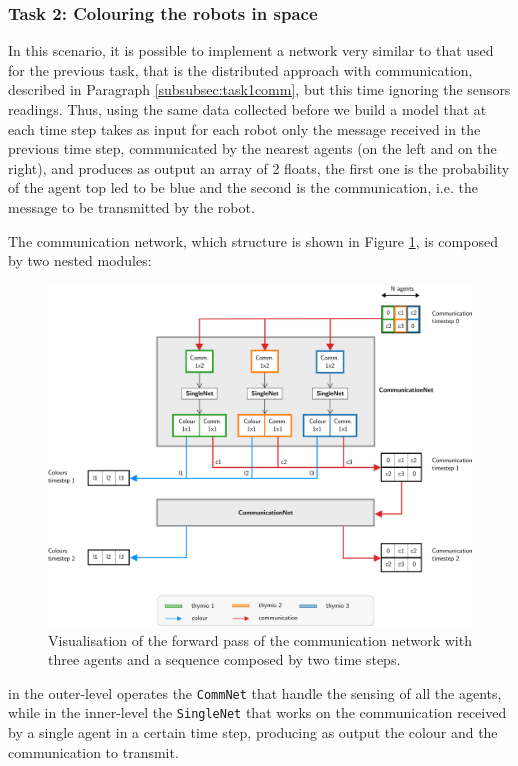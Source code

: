 \subsubsection{Task 2: Colouring the robots in space}
In this scenario, it is possible to implement a network very similar to that used for 
the previous task, that is the distributed approach with communication, described 
in Paragraph \ref{subsubsec:task1comm}, but this time ignoring the sensors 
readings.
Thus, using the same data collected before we build a model that at each time 
step takes as input for each robot only the message received in the previous time 
step, communicated by the nearest agents (on the left and on the right), and 
produces as output an array of 2 floats, the first one is the probability of the agent 
top \gls{led} to be blue and the second is the communication, i.e. the message to 
be transmitted by the robot.

The communication network, which structure is shown in Figure 
\ref{fig:commnet2}, is composed by two nested modules: 
\begin{figure}[!htb]
	\centering
	\includegraphics[width=\textwidth]{contents/images/commnettask2}
	\caption[Communication network of the second task.]{Visualisation of the 
		forward pass of the communication network with three agents and a 
		sequence 
		composed by two time steps.}
	\label{fig:commnet2}
\end{figure}
in the outer-level operates the \texttt{CommNet} that handle the 
sensing of all the agents, while in the inner-level the \texttt{SingleNet} that 
works on the communication received by a single agent in a certain time 
step, producing as output the colour and the communication to transmit. 

